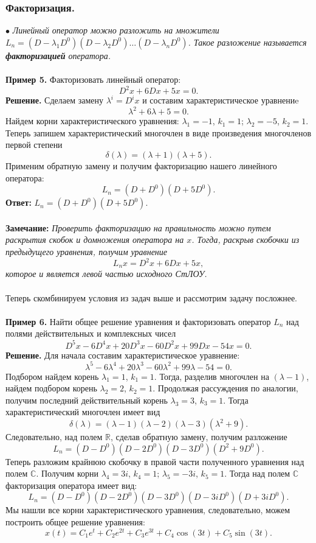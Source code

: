 \documentclass[a4paper, 12pt]{article}
\newcommand{\Rm}{\mathbb{R}}
\newcommand{\Cm}{\mathbb{C}}
\begin{document}
	\subsubsection*{Факторизация.}
	$\bullet$ \textit{Линейный оператор можно разложить на множители $L_n = (D-\lambda_1D^0)(D-\lambda_2D^0)\ldots(D-\lambda_nD^0)$. Такое разложение называется \textbf{факторизацией} оператора.}\\\\
	\textbf{Пример 5.} Факторизовать линейный оператор:
	$$D^2x + 6Dx + 5x = 0.$$
	\textbf{Решение.} Сделаем замену $\lambda^i = D^ix$ и составим характеристическое уравнениe $$\lambda^2 + 6\lambda + 5 = 0.$$ Найдем корни характеристического уравнения: $\lambda_1 = -1$, $k_1 = 1$; $\lambda_2 = -5$, $k_2 = 1$. Теперь запишем характеристический многочлен в виде произведения многочленов первой степени $$\delta(\lambda) = (\lambda + 1)(\lambda + 5).$$ Применим обратную замену и получим факторизацию нашего линейного оператора: $$L_n = (D+D^0)(D + 5D^0).$$
	\textbf{Ответ:} $L_n = (D+D^0)(D + 5D^0).$\\\\
	\textbf{Замечание:} \textit{Проверить факторизацию на правильность можно путем раскрытия скобок и домножения оператора на $x$. Тогда, раскрыв скобочки из предыдущего уравнения, получим уравнение $$L_n x = D^2x + 6Dx + 5x,$$ которое и является левой частью исходного СтЛОУ.}\\\\
	Теперь скомбинируем условия из задач выше и рассмотрим задачу посложнее.\\\\
	\textbf{Пример 6.} Найти общее решение уравнения и факторизовать оператор $L_n$ над полями действительных и комплексных чисел $$D^5 x-6D^4 x+20D^3 x-60D^2 x+99Dx-54x = 0.$$
	\textbf{Решение.} Для начала составим характеристическое уравнение: $$\lambda^5 - 6\lambda^4 + 20\lambda^3 - 60\lambda^2 + 99 \lambda - 54 = 0.$$
	Подбором найдем корень $\lambda_1 = 1$, $k_1 = 1$. Тогда, разделив многочлен на $(\lambda - 1)$, найдем подбором корень $\lambda_2 = 2$, $k_2 = 1$. Продолжая рассуждения по аналогии, получим последний действительный корень $\lambda_3 = 3$, $k_3 = 1$. Тогда характеристический многочлен имеет вид $$\delta(\lambda) = (\lambda-1)(\lambda-2)(\lambda-3)(\lambda^2 + 9).$$
	Следовательно, над полем $\Rm$, сделав обратную замену, получим разложение $$L_n = (D-D^0)(D-2D^0)(D-3D^0)(D^2 + 9D^0).$$
	Теперь разложим крайнюю скобочку в правой части полученного уравнения над полем $\Cm$. Получим корни $\lambda_4 = 3i$, $k_4 = 1$; $\lambda_5 = -3i$, $k_5 = 1$. Тогда над полем $\Cm$ факторизация оператора имеет вид: 
	$$L_n = (D-D^0)(D-2D^0)(D-3D^0)(D - 3iD^0)(D+3iD^0).$$
	Мы нашли все корни характеристического уравнения, следовательно, можем построить общее решение уравнения: $$x(t) = C_1e^t + C_2e^{2t} + C_3e^{3t} + C_4\cos(3t) + C_5 \sin(3t).$$
\end{document}
